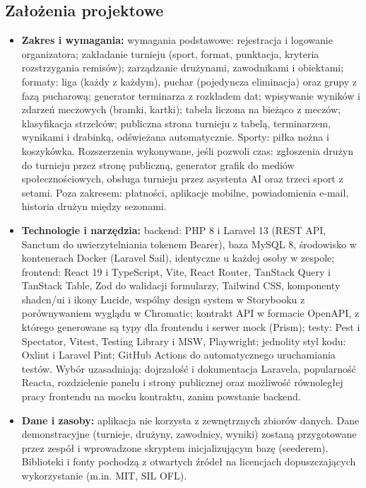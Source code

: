 \documentclass[11pt,a4paper,oneside]{article}
\newif\ifpodpowiedzi
\newcommand{\podpowiedz}[1]{\ifpodpowiedzi\par\begingroup\small\color{hintcolor}\textit{Wskazówka: #1}\par\endgroup\fi}
\begin{document}
\subsection{Założenia projektowe}
\podpowiedz{Określ zakres możliwy do wykonania przez zespół w jednym semestrze, z uwzględnieniem jego liczebności. Oddziel wymagania podstawowe od rozszerzeń, które zostaną wykonane, jeśli pozwoli na to czas. Poniższe punkty dostosuj do charakteru projektu.}
\begin{itemize}
\item \textbf{Zakres i wymagania:} wymagania podstawowe: rejestracja i logowanie organizatora; zakładanie turnieju (sport, format, punktacja, kryteria rozstrzygania remisów); zarządzanie drużynami, zawodnikami i obiektami; formaty: liga (każdy z każdym), puchar (pojedyncza eliminacja) oraz grupy z fazą pucharową; generator terminarza z rozkładem dat; wpisywanie wyników i zdarzeń meczowych (bramki, kartki); tabela liczona na bieżąco z meczów; klasyfikacja strzelców; publiczna strona turnieju z tabelą, terminarzem, wynikami i drabinką, odświeżana automatycznie. Sporty: piłka nożna i koszykówka. Rozszerzenia wykonywane, jeśli pozwoli czas: zgłoszenia drużyn do turnieju przez stronę publiczną, generator grafik do mediów społecznościowych, obsługa turnieju przez asystenta AI oraz trzeci sport z setami. Poza zakresem: płatności, aplikacje mobilne, powiadomienia e-mail, historia drużyn między sezonami.
\item \textbf{Technologie i narzędzia:} backend: PHP 8 i Laravel 13 (REST API, Sanctum do uwierzytelniania tokenem Bearer), baza MySQL 8, środowisko w kontenerach Docker (Laravel Sail), identyczne u każdej osoby w zespole; frontend: React 19 i TypeScript, Vite, React Router, TanStack Query i TanStack Table, Zod do walidacji formularzy, Tailwind CSS, komponenty shadcn/ui i ikony Lucide, wspólny design system w Storybooku z porównywaniem wyglądu w Chromatic; kontrakt API w formacie OpenAPI, z którego generowane są typy dla frontendu i serwer mock (Prism); testy: Pest i Spectator, Vitest, Testing Library i MSW, Playwright; jednolity styl kodu: Oxlint i Laravel Pint; GitHub Actions do automatycznego uruchamiania testów. Wybór uzasadniają: dojrzałość i dokumentacja Laravela, popularność Reacta, rozdzielenie panelu i strony publicznej oraz możliwość równoległej pracy frontendu na mocku kontraktu, zanim powstanie backend.
\item \textbf{Dane i zasoby:} aplikacja nie korzysta z zewnętrznych zbiorów danych. Dane demonstracyjne (turnieje, drużyny, zawodnicy, wyniki) zostaną przygotowane przez zespół i wprowadzone skryptem inicjalizującym bazę (seederem). Biblioteki i fonty pochodzą z otwartych źródeł na licencjach dopuszczających wykorzystanie (m.in. MIT, SIL OFL).

\end{itemize}
\end{document}
